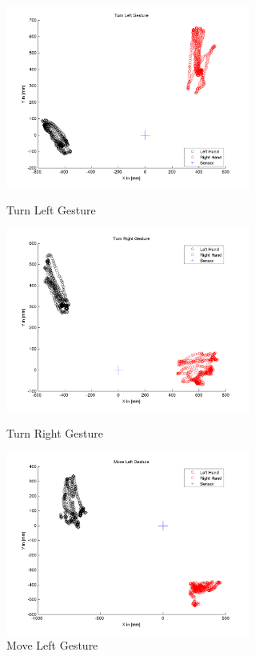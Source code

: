 \begin{figure}	 	
	\begin{minipage}
		{.45 
		\textwidth} 
		\centering 
		\includegraphics[height=60mm]{figures/result/train-turn-left.jpg} \caption*{Turn Left Gesture} 
	\end{minipage}
	\begin{minipage}
		{.45 
		\textwidth}  
		\centering
		\includegraphics[height=60mm]{figures/result/train-turn-right.jpg} \caption*{Turn Right Gesture}
	\end{minipage}
	\begin{minipage}
		{.45 
		\textwidth}  
		\centering
		\includegraphics[height=60mm]{figures/result/train-move-left.jpg} \caption*{Move Left Gesture} 
	\end{minipage}
	\begin{minipage}

\end{minipage}
\end{figure}
